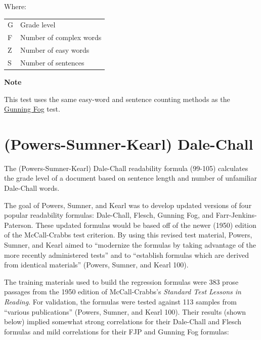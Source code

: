 \documentclass[
]{book}
\newenvironment{notesection}
    {
    \begin{tcolorbox}[colframe=mediumblue,colback=lightblue,coltext=mediumblue,arc=3mm]
    \faLightbulb[regular] \textbf{Note} \newline
    }
    {
    \end{tcolorbox}
    }
\theoremstyle{definition}
\theoremstyle{definition}
\theoremstyle{definition}
\theoremstyle{definition}
\theoremstyle{remark}
\begin{document}
Where:

\begin{longtable}[]{@{}
  >{\raggedright\arraybackslash}p{}
  >{\raggedright\arraybackslash}p{}@{}}
\toprule
\endhead
G & Grade level \\
F & Number of complex words \\
Z & Number of easy words \\
S & Number of sentences \\
\bottomrule
\end{longtable}

\begin{notesection}
This test uses the same easy-word and sentence counting methods as the \protect\hyperlink{gunning-fog-test}{Gunning Fog} test.

\end{notesection}

\newpage

\hypertarget{psk-dale-chall}{%
\section{\texorpdfstring{(Powers-Sumner-Kearl) Dale-Chall}{(Powers-Sumner-Kearl) Dale-Chall}}\label{psk-dale-chall}}

The (Powers-Sumner-Kearl) Dale-Chall readability formula (99-105) calculates the grade level of a document based on sentence length and number of unfamiliar Dale-Chall words.

The goal of Powers, Sumner, and Kearl was to develop updated versions of four popular readability formulas: Dale-Chall, Flesch, Gunning Fog, and Farr-Jenkins-Paterson. These updated formulas would be based off of the newer (1950) edition of the McCall-Crabbs test criterion. By using this revised test material, Powers, Sumner, and Kearl aimed to ``modernize the formulas by taking advantage of the more recently administered tests'' and to ``establish formulas which are derived from identical materials'' (Powers, Sumner, and Kearl 100).

The training materials used to build the regression formulas were 383 prose passages from the 1950 edition of McCall-Crabbs's \emph{Standard Test Lessons in Reading}. For validation, the formulas were tested against 113 samples from ``various publications'' (Powers, Sumner, and Kearl 100). Their results (shown below) implied somewhat strong correlations for their Dale-Chall and Flesch formulas and mild correlations for their FJP and Gunning Fog formulas:
\end{document}
